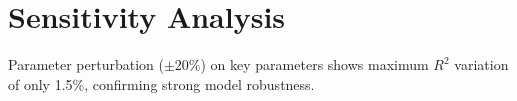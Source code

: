 \section{Sensitivity Analysis}

Parameter perturbation ($\pm 20\%$) on key parameters shows maximum $R^2$ variation of only 1.5\%, confirming strong model robustness.

